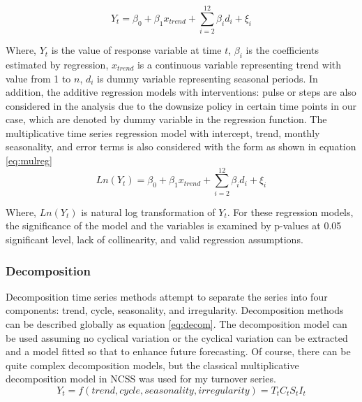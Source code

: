 \begin{equation}
	\label{equation:reg}
	Y_t = \beta_0+\beta_1 x_{trend} + \sum_{i=2}^{12} {\beta_i d_i}+\xi_i
\end{equation}

Where, $Y_t$ is the value of response variable at time $t$,  $\beta_i$ is the coefficients estimated by regression, $x_{trend}$ is a continuous variable representing trend with value from 1 to $n$, $d_i$ is dummy variable representing seasonal periods. In addition, the additive regression models with interventions: pulse or steps are also considered in the analysis due to the downsize policy in certain time points in our case, which are denoted by dummy variable in the regression function. The multiplicative time series regression model with intercept, trend, monthly seasonality, and error terms is also considered with the form as shown in equation \ref{eq:mulreg}
\begin{equation}
	\label{eq:mulreg}
	Ln(Y_t)=\beta_0+\beta_1 x_{trend} +\sum_{i=2}^{12} {\beta_i d_i}+\xi_i                              
\end{equation}

Where, $Ln(Y_t)$ is natural log transformation of $Y_t$. For these regression models, the significance of the model and the variables is examined by p-values at 0.05 significant level, lack of collinearity, and valid regression assumptions. 

\subsubsection{Decomposition}
Decomposition time series methods attempt to separate the series into four components: trend, cycle, seasonality, and irregularity. Decomposition methods can be described globally as equation \ref{eq:decom}. The decomposition model can be used assuming no cyclical variation or the cyclical variation can be extracted and a model fitted so that to enhance future forecasting. Of course, there can be quite complex decomposition models, but the classical multiplicative decomposition model in NCSS was used for my turnover series.
\begin{equation}
	\label{eq:decom}
	Y_t  =f(trend,cycle,seasonality,irregularity)=T_t  C_t S_t I_t            
\end{equation}


